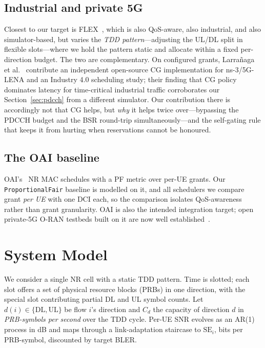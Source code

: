 \documentclass[conference]{IEEEtran}
\begin{document}
\subsection{Industrial and private 5G}
Closest to our target is FLEX~\cite{kleinberger2026flex}, which is also
QoS-aware, also industrial, and also simulator-based, but varies the
\emph{TDD pattern}---adjusting the UL/DL split in flexible slots---where we
hold the pattern static and allocate within a fixed per-direction budget.
The two are complementary. On configured grants, Larra\~{n}aga et
al.~\cite{larranaga2023cg} contribute an independent open-source CG
implementation for ns-3/5G-LENA and an Industry 4.0 scheduling study; their
finding that CG policy dominates latency for time-critical industrial
traffic corroborates our Section~\ref{sec:pdcch} from a different
simulator. Our contribution there is accordingly not that CG helps, but
\emph{why} it helps twice over---bypassing the PDCCH budget and the BSR
round-trip simultaneously---and the self-gating rule that keeps it from
hurting when reservations cannot be honoured.

\subsection{The OAI baseline}
OAI's~\cite{oai} NR MAC schedules with a PF metric over per-UE grants. Our
\texttt{ProportionalFair} baseline is modelled on it, and all schedulers we
compare grant \emph{per UE} with one DCI each, so the comparison isolates
QoS-awareness rather than grant granularity. OAI is also the intended integration target; open private-5G O-RAN testbeds
built on it are now well established~\cite{villa2024x5g}.

\section{System Model}\label{sec:model}

We consider a single NR cell with a static TDD pattern. Time is slotted;
each slot offers a set of physical resource blocks (PRBs) in one direction,
with the special slot contributing partial DL and UL symbol counts. Let
$d(i)\in\{\mathrm{DL},\mathrm{UL}\}$ be flow $i$'s direction and $C_d$ the
capacity of direction $d$ in \emph{PRB-symbols per second} over the TDD
cycle. Per-UE SNR evolves as an AR(1) process in dB and maps through a
link-adaptation staircase to $\mathrm{SE}_i$, bits per
PRB-symbol, discounted by target BLER.
\end{document}
